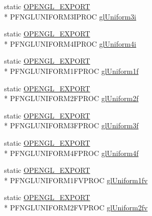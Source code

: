 \begin{DoxyCompactItemize}
\item 
static \hyperlink{_config_8h_a77401aa3bc0a379879047c1bd30f262e}{O\+P\+E\+N\+G\+L\+\_\+\+E\+X\+P\+O\+R\+T} \\*
P\+F\+N\+G\+L\+U\+N\+I\+F\+O\+R\+M3\+I\+P\+R\+O\+C \hyperlink{class_agmd_1_1_g_l_driver_a946a756d2e36f0e6ac6dc4b06f4855c9}{gl\+Uniform3i}
\item 
static \hyperlink{_config_8h_a77401aa3bc0a379879047c1bd30f262e}{O\+P\+E\+N\+G\+L\+\_\+\+E\+X\+P\+O\+R\+T} \\*
P\+F\+N\+G\+L\+U\+N\+I\+F\+O\+R\+M4\+I\+P\+R\+O\+C \hyperlink{class_agmd_1_1_g_l_driver_ae9d4d2bea223ebfc042a8bd19229b7cf}{gl\+Uniform4i}
\item 
static \hyperlink{_config_8h_a77401aa3bc0a379879047c1bd30f262e}{O\+P\+E\+N\+G\+L\+\_\+\+E\+X\+P\+O\+R\+T} \\*
P\+F\+N\+G\+L\+U\+N\+I\+F\+O\+R\+M1\+F\+P\+R\+O\+C \hyperlink{class_agmd_1_1_g_l_driver_a019e942b0ec6713854a2ae51a50d5ae3}{gl\+Uniform1f}
\item 
static \hyperlink{_config_8h_a77401aa3bc0a379879047c1bd30f262e}{O\+P\+E\+N\+G\+L\+\_\+\+E\+X\+P\+O\+R\+T} \\*
P\+F\+N\+G\+L\+U\+N\+I\+F\+O\+R\+M2\+F\+P\+R\+O\+C \hyperlink{class_agmd_1_1_g_l_driver_ae7cbbc931fbd433c75e8c6124bf3dc14}{gl\+Uniform2f}
\item 
static \hyperlink{_config_8h_a77401aa3bc0a379879047c1bd30f262e}{O\+P\+E\+N\+G\+L\+\_\+\+E\+X\+P\+O\+R\+T} \\*
P\+F\+N\+G\+L\+U\+N\+I\+F\+O\+R\+M3\+F\+P\+R\+O\+C \hyperlink{class_agmd_1_1_g_l_driver_a50d983ba6ff60b7ae331d6d7c55eba85}{gl\+Uniform3f}
\item 
static \hyperlink{_config_8h_a77401aa3bc0a379879047c1bd30f262e}{O\+P\+E\+N\+G\+L\+\_\+\+E\+X\+P\+O\+R\+T} \\*
P\+F\+N\+G\+L\+U\+N\+I\+F\+O\+R\+M4\+F\+P\+R\+O\+C \hyperlink{class_agmd_1_1_g_l_driver_a199bbbb46d7dc6585d38683580d43939}{gl\+Uniform4f}
\item 
static \hyperlink{_config_8h_a77401aa3bc0a379879047c1bd30f262e}{O\+P\+E\+N\+G\+L\+\_\+\+E\+X\+P\+O\+R\+T} \\*
P\+F\+N\+G\+L\+U\+N\+I\+F\+O\+R\+M1\+F\+V\+P\+R\+O\+C \hyperlink{class_agmd_1_1_g_l_driver_ac9bee7c2ee9bc6599967ed459e6214a5}{gl\+Uniform1fv}
\item 
static \hyperlink{_config_8h_a77401aa3bc0a379879047c1bd30f262e}{O\+P\+E\+N\+G\+L\+\_\+\+E\+X\+P\+O\+R\+T} \\*
P\+F\+N\+G\+L\+U\+N\+I\+F\+O\+R\+M2\+F\+V\+P\+R\+O\+C \hyperlink{class_agmd_1_1_g_l_driver_aeed2ed646f910a532c8fa45563cb79cd}{gl\+Uniform2fv}

\end{DoxyCompactItemize}
